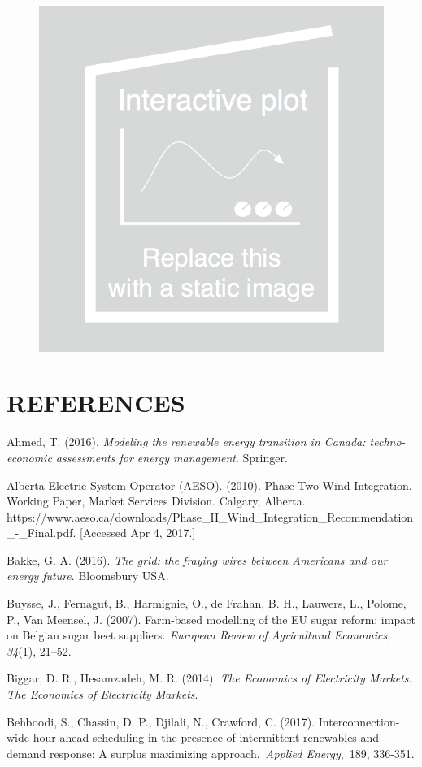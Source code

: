 \documentclass[10pt,letter]{article}
\begin{document}
\begin{figure}[h!]
\begin{center}
\includegraphics[width=0.70\columnwidth]{./static.png}
\caption{{%
}}
\end{center}
\end{figure}

\section{REFERENCES }\label{references}

Ahmed, T. (2016). \emph{Modeling the renewable energy transition in
Canada: techno-economic assessments for energy management}. Springer.

Alberta Electric System Operator (AESO). (2010). Phase Two Wind
Integration. Working Paper, Market Services Division. Calgary, Alberta.
https://www.aeso.ca/downloads/Phase\_II\_Wind\_Integration\_Recommendation\_-\_Final.pdf.
{[}Accessed Apr 4, 2017.{]}

Bakke, G. A. (2016). \emph{The grid: the fraying wires between Americans
and our energy future}. Bloomsbury USA.

Buysse, J., Fernagut, B., Harmignie, O., de Frahan, B. H., Lauwers, L.,
Polome, P., Van Meensel, J. (2007). Farm-based modelling of the EU sugar
reform: impact on Belgian sugar beet suppliers. \emph{European Review of
Agricultural Economics}, \emph{34}(1), 21--52.

Biggar, D. R., Hesamzadeh, M. R. (2014). \emph{The Economics of
Electricity Markets}. \emph{The Economics of Electricity Markets}.

Behboodi, S., Chassin, D. P., Djilali, N., Crawford, C. (2017).
Interconnection-wide hour-ahead scheduling in the presence of
intermittent renewables and demand response: A surplus maximizing
approach.~\emph{Applied Energy},~189, 336-351.
\end{document}
